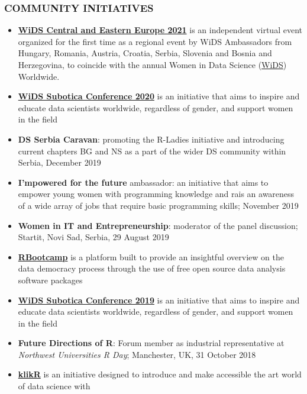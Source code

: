 \documentclass[
]{article}
\providecommand{\tightlist}{%
  \setlength{\itemsep}{0pt}\setlength{\parskip}{0pt}}
\begin{document}
\hypertarget{community-initiatives}{%
\subsubsection{COMMUNITY INITIATIVES}\label{community-initiatives}}

\begin{itemize}
\tightlist
\item
  \href{https://widscee.wixsite.com/about}{\textbf{WiDS Central and
  Eastern Europe 2021}} is an independent virtual event organized for
  the first time as a regional event by WiDS Ambassadors from Hungary,
  Romania, Austria, Croatia, Serbia, Slovenia and Bosnia and
  Herzegovina, to coincide with the annual Women in Data Science
  (\href{https://www.widsconference.org}{WiDS}) Worldwide.
\item
  \href{https://suwids2.netlify.app}{\textbf{WiDS Subotica Conference
  2020}} is an initiative that aims to inspire and educate data
  scientists worldwide, regardless of gender, and support women in the
  field
\item
  \textbf{DS Serbia Caravan}: promoting the R-Ladies initiative and
  introducing current chapters BG and NS as a part of the wider DS
  community within Serbia, December 2019
\item
  \textbf{I'mpowered for the future} ambassador: an initiative that aims
  to empower young women with programming knowledge and rais an
  awareness of a wide array of jobs that require basic programming
  skills; November 2019
\item
  \textbf{Women in IT and Entrepreneurship}: moderator of the panel
  discussion; Startit, Novi Sad, Serbia, 29 August 2019
\item
  \href{http://rbootcamp.rbind.io}{\textbf{RBootcamp}} is a platform
  built to provide an insightful overview on the data democracy process
  through the use of free open source data analysis software packages
\item
  \href{https://widssubotica.netlify.com}{\textbf{WiDS Subotica
  Conference 2019}} is an initiative that aims to inspire and educate
  data scientists worldwide, regardless of gender, and support women in
  the field
\item
  \textbf{Future Directions of R}: Forum member as industrial
  representative at \emph{Northwest Universities R Day}; Manchester, UK,
  31 October 2018
\item
  \href{http://klikr.rbind.io}{\textbf{klikR}} is an initiative designed
  to introduce and make accessible the art world of data science with

\end{itemize}
\end{document}
